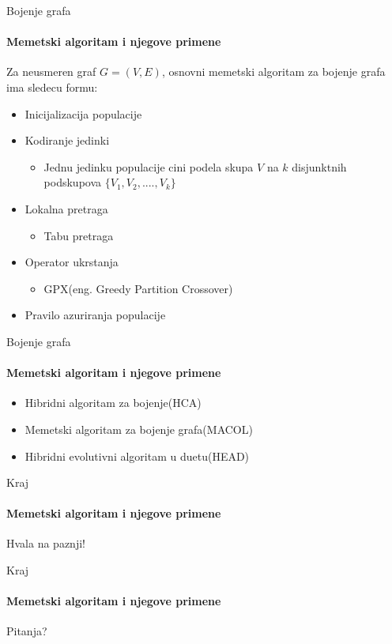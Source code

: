 \documentclass{beamer}
\begin{document}
\begin{frame}[fragile]{Bojenje grafa}
  \framesubtitle{Memetski algoritam i njegove primene}

Za neusmeren graf $G = (V, E)$, osnovni memetski algoritam za bojenje grafa ima sledecu formu:
   \begin{itemize}
    \item{Inicijalizacija populacije}
    \item{Kodiranje jedinki}
        \begin{itemize}
            \item Jednu jedinku populacije cini podela skupa $V$ na $k$  disjunktnih podskupova $\{V_1, V_2, ...., V_k\}$
        \end{itemize}
    \item{Lokalna pretraga}
        \begin{itemize}
            \item Tabu pretraga
        \end{itemize}
    \item{Operator ukrstanja}
        \begin{itemize}
            \item GPX(eng. Greedy Partition Crossover)
        \end{itemize}
    \item{Pravilo azuriranja populacije}
  \end{itemize}



\end{frame}




\begin{frame}[fragile]{Bojenje grafa}
  \framesubtitle{Memetski algoritam i njegove primene}

   \begin{itemize}
    \item{Hibridni algoritam za bojenje(HCA)}
    \item{Memetski algoritam za bojenje grafa(MACOL)}
    \item{Hibridni evolutivni algoritam u duetu(HEAD)}
  \end{itemize}
  

\end{frame}


\begin{frame}{Kraj}
  \framesubtitle{Memetski algoritam i njegove primene}

  
\centering
\Huge{Hvala na paznji!}

\end{frame}




\begin{frame}{Kraj}
  \framesubtitle{Memetski algoritam i njegove primene}
\centering
\Huge{Pitanja?}

\end{frame}
\end{document}
